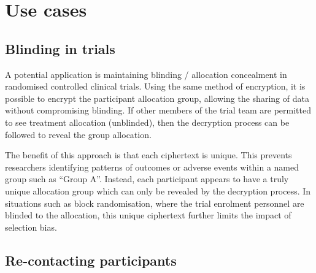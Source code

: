 \documentclass[
  12pt,
  krantz2]{krantz}
\makeatletter
\newenvironment{Shaded}{\begin{snugshade}}{\end{snugshade}}
\newcommand{\DataTypeTok}[1]{\textcolor[rgb]{0.13,0.29,0.53}{#1}}
\newcommand{\KeywordTok}[1]{\textcolor[rgb]{0.13,0.29,0.53}{\textbf{#1}}}
\newcommand{\NormalTok}[1]{#1}
\newcommand{\OperatorTok}[1]{\textcolor[rgb]{0.81,0.36,0.00}{\textbf{#1}}}
\newcommand{\StringTok}[1]{\textcolor[rgb]{0.31,0.60,0.02}{#1}}
\newenvironment{kframe}{%
\medskip{}
\setlength{\fboxsep}{.8em}
 \def\at@end@of@kframe{}%
 \ifinner\ifhmode%
  \def\at@end@of@kframe{\end{minipage}}%
  \begin{minipage}{\columnwidth}%
 \fi\fi%
 \def\FrameCommand##1{\hskip\@totalleftmargin \hskip-\fboxsep
 \colorbox{shadecolor}{##1}\hskip-\fboxsep
     \hskip-\linewidth \hskip-\@totalleftmargin \hskip\columnwidth}%
 \MakeFramed {\advance\hsize-\width
   \@totalleftmargin\z@ \linewidth\hsize
   \@setminipage}}%
 {\par\unskip\endMakeFramed%
 \at@end@of@kframe}
\renewenvironment{Shaded}{\begin{kframe}}{\end{kframe}}
\makeatother
\begin{document}
\begin{Shaded}
\end{Shaded}

\hypertarget{use-cases}{%
\section{Use cases}\label{use-cases}}


\hypertarget{blinding-in-trials}{%
\subsection{Blinding in trials}\label{blinding-in-trials}}

A potential application is maintaining blinding / allocation concealment in randomised controlled clinical trials.
Using the same method of encryption, it is possible to encrypt the participant allocation group, allowing the sharing of data without compromising blinding.
If other members of the trial team are permitted to see treatment allocation (unblinded), then the decryption process can be followed to reveal the group allocation.

The benefit of this approach is that each ciphertext is unique.
This prevents researchers identifying patterns of outcomes or adverse events within a named group such as ``Group A''.
Instead, each participant appears to have a truly unique allocation group which can only be revealed by the decryption process.
In situations such as block randomisation, where the trial enrolment personnel are blinded to the allocation, this unique ciphertext further limits the impact of selection bias.

\hypertarget{re-contacting-participants}{%
\subsection{Re-contacting participants}\label{re-contacting-participants}}
\end{document}
